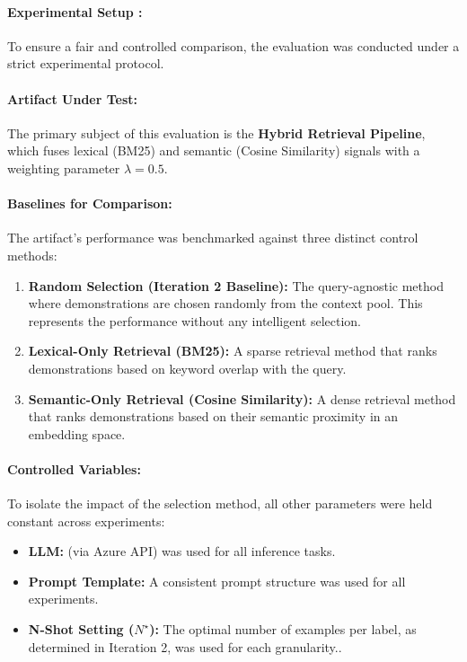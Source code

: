 \paragraph{Experimental Setup :}

To ensure a fair and controlled comparison, the evaluation was conducted under a strict experimental protocol.

\paragraph{Artifact Under Test:} The primary subject of this evaluation is the \textbf{Hybrid Retrieval Pipeline}, which fuses lexical (BM25) and semantic (Cosine Similarity) signals with a weighting parameter $\lambda=0.5$.

\paragraph{Baselines for Comparison:} The artifact's performance was benchmarked against three distinct control methods:
\begin{enumerate}
    \item \textbf{Random Selection (Iteration 2 Baseline):} The query-agnostic method where demonstrations are chosen randomly from the context pool. This represents the performance without any intelligent selection.
    \item \textbf{Lexical-Only Retrieval (BM25):} A sparse retrieval method that ranks demonstrations based on keyword overlap with the query.
    \item \textbf{Semantic-Only Retrieval (Cosine Similarity):} A dense retrieval method that ranks demonstrations based on their semantic proximity in an embedding space.
\end{enumerate}

\paragraph{Controlled Variables:} To isolate the impact of the selection method, all other parameters were held constant across experiments:
\begin{itemize}
    \item \textbf{LLM:} (via Azure API) was used for all inference tasks.
    \item \textbf{Prompt Template:} A consistent prompt structure was used for all experiments.
    \item \textbf{N-Shot Setting ($N^\star$):} The optimal number of examples per label, as determined in Iteration 2, was used for each granularity..
\end{itemize}

